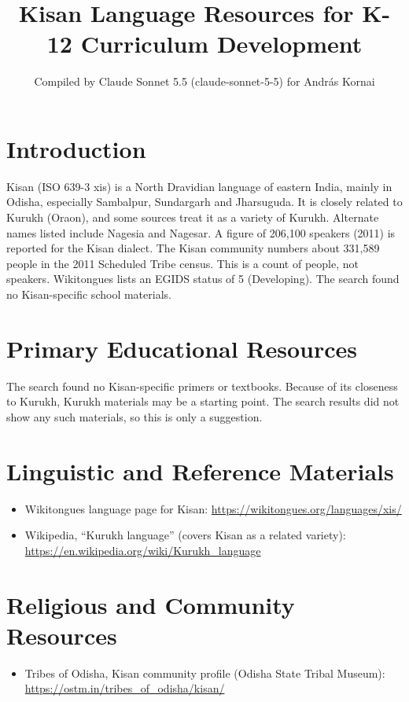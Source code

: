 \documentclass[12pt]{article}
\title{Kisan Language Resources for K-12 Curriculum Development}
\author{Compiled by Claude Sonnet 5.5 (claude-sonnet-5-5) for Andr\'as Kornai}
\date{}
\begin{document}
\maketitle

\section{Introduction}
Kisan (ISO 639-3 xis) is a North Dravidian language of eastern India, mainly in Odisha, especially Sambalpur, Sundargarh and Jharsuguda. It is closely related to Kurukh (Oraon), and some sources treat it as a variety of Kurukh. Alternate names listed include Nagesia and Nagesar. A figure of 206,100 speakers (2011) is reported for the Kisan dialect. The Kisan community numbers about 331,589 people in the 2011 Scheduled Tribe census. This is a count of people, not speakers. Wikitongues lists an EGIDS status of 5 (Developing). The search found no Kisan-specific school materials.

\section{Primary Educational Resources}
The search found no Kisan-specific primers or textbooks. Because of its closeness to Kurukh, Kurukh materials may be a starting point. The search results did not show any such materials, so this is only a suggestion.

\section{Linguistic and Reference Materials}
\begin{itemize}
\item Wikitongues language page for Kisan: \url{https://wikitongues.org/languages/xis/}
\item Wikipedia, ``Kurukh language'' (covers Kisan as a related variety): \url{https://en.wikipedia.org/wiki/Kurukh_language}
\end{itemize}

\section{Religious and Community Resources}
\begin{itemize}
\item Tribes of Odisha, Kisan community profile (Odisha State Tribal Museum): \url{https://ostm.in/tribes_of_odisha/kisan/}
\end{itemize}
\end{document}
